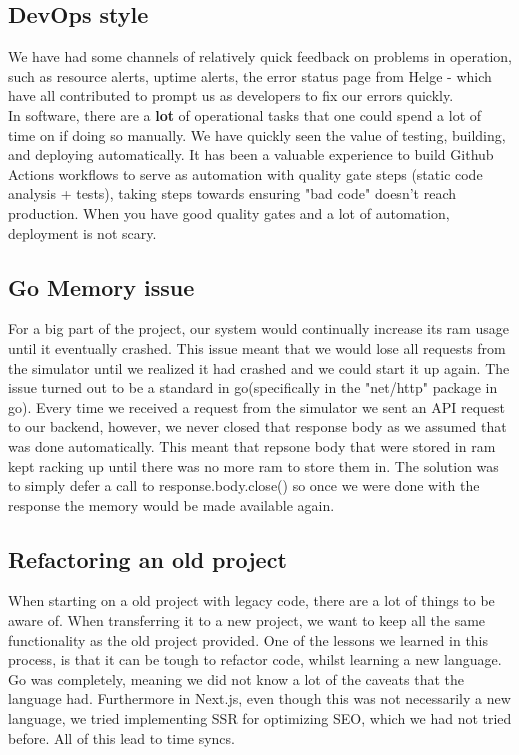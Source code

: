 \subsection{DevOps style}
We have had some channels of relatively quick feedback on problems in operation, such as resource alerts, uptime alerts, the error status page from Helge - which have all contributed to prompt us as developers to fix our errors quickly. \\
In software, there are a \textbf{lot} of operational tasks that one could spend a lot of time on if doing so manually. We have quickly seen the value of testing, building, and deploying automatically. It has been a valuable experience to build Github Actions workflows to serve as automation with quality gate steps (static code analysis + tests), taking steps towards ensuring "bad code" doesn't reach production.  
When you have good quality gates and a lot of automation, deployment is not scary.
 
\subsection{Go Memory issue}
For a big part of the project, our system would continually increase its ram usage until it eventually crashed. This issue meant that we would lose all requests from the simulator until we realized it had crashed and we could start it up again. The issue turned out to be a standard in go(specifically in the "net/http" package in go). Every time we received a request from the simulator we sent an API request to our backend, however, we never closed that response body as we assumed that was done automatically. This meant that repsone body that were stored in ram kept racking up until there was no more ram to store them in. The solution was to simply defer a call to response.body.close() so once we were done with the response the memory would be made available again. 

\subsection{Refactoring an old project}
When starting on a old project with legacy code, there are a lot of things to be aware of. When transferring it to a new project, we want to keep all the same functionality as the old project provided. One of the lessons we learned in this process, is that it can be tough to refactor code, whilst learning a new language. Go was completely, meaning we did not know a lot of the caveats that the language had. Furthermore in Next.js, even though this was not necessarily a new language, we tried implementing SSR for optimizing SEO, which we had not tried before. All of this lead to time syncs. 

